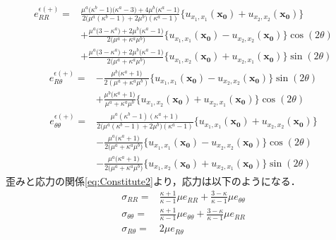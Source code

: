 \begin{align}
	e_{RR}^{\epsilon(+)}
	=&\frac{ \mu^{a}\bigl(\kappa^{b}-1\bigr)\bigl(\kappa^{a}-3\bigr)+4\mu^{b}\bigl(\kappa^{a}-1\bigr)　}
		{2\bigl(\mu^{a}(\kappa^{b}-1)+2\mu^{b}\bigr)(\kappa^{a}-1)}
	\bigl\{u_{x_{1},x_{1}}(\bm{x_{0}})+u_{x_{2},x_{2}}(\bm{x_{0}})\bigr\}
	\nonumber
	\\
	&+\frac{\mu^{a}\bigl(3-\kappa^{a}\bigr)+2\mu^{b}\bigl(\kappa^{a}-1\bigr)}{2\bigl(\mu^{a}+\kappa^{a}\mu^{b}\bigr)}
	\bigl\{u_{x_{1},x_{1}}(\bm{x_{0}})-u_{x_{2},x_{2}}(\bm{x_{0}})\bigr\}\cos(2\theta)
	\nonumber
	\\
	&+\frac{\mu^{a}\bigl(3-\kappa^{a}\bigr)+2\mu^{b}\bigl(\kappa^{a}-1\bigr)}{2\bigl(\mu^{a}+\kappa^{a}\mu^{b}\bigr)}
	\bigl\{u_{x_{1},x_{2}}(\bm{x_{0}})+u_{x_{2},x_{1}}(\bm{x_{0}})\bigr\}\sin(2\theta)
	\label{eq:eRROutEpsSol}
\end{align}
\begin{align}
	e_{R\theta}^{\epsilon(+)}
	=&-\frac{\mu^{b}\bigl(\kappa^{a}+1\bigr)}{2(\mu^{a}+\kappa^{a}\mu^{b})}
	\bigl\{u_{x_{1},x_{1}}(\bm{x_{0}})-u_{x_{2},x_{2}}(\bm{x_{0}})\bigr\}\sin(2\theta)
	\nonumber
	\\
	&+\frac{\mu^{b}\bigl(\kappa^{a}+1\bigr)}{\mu^{a}+\kappa^{a}\mu^{b}}
	\bigl\{u_{x_{1},x_{2}}(\bm{x_{0}})+u_{x_{2},x_{1}}(\bm{x_{0}})\bigr\}\cos(2\theta)
	\label{eq:eRThOutEpsSol}
\end{align}
\begin{align}
	e_{\theta\theta}^{\epsilon(+)}
	=&\frac{\mu^{a}(\kappa^{b}-1)(\kappa^{a}+1)}
	{2\bigl(\mu^{a}(\kappa^{b}-1)+2\mu^{b}\bigr)(\kappa^{a}-1)}
	\bigl\{u_{x_{1},x_{1}}(\bm{x_{0}})+u_{x_{2},x_{2}}(\bm{x_{0}})\bigr\}
	\nonumber
	\\
	&-\frac{\mu^{a}\bigl(\kappa^{a}+1\bigr)}{2\bigl(\mu^{a}+\kappa^{a}\mu^{b}\bigr)}
	\bigl\{u_{x_{1},x_{1}}(\bm{x_{0}})-u_{x_{2},x_{2}}(\bm{x_{0}})\bigr\}\cos(2\theta)
	\nonumber
	\\
	&-\frac{\mu^{a}\bigl(\kappa^{a}+1\bigr)}{2\bigl(\mu^{a}+\kappa^{a}\mu^{b}\bigr)}
	\bigl\{u_{x_{1},x_{2}}(\bm{x_{0}})+u_{x_{2},x_{1}}(\bm{x_{0}})\bigr\}\sin(2\theta)
	\label{eq:eThThOutEpsSol}
\end{align}
歪みと応力の関係\eqref{eq:Constitute2}より，応力は以下のようになる．
\begin{align}
	\sigma_{RR}
	=&\frac{\kappa+1}{\kappa-1}\mu e_{RR}^{}+\frac{3-\kappa}{\kappa-1}\mu e_{\theta\theta}^{}
	\nonumber
	\\
	\sigma_{\theta\theta}
	=&\frac{\kappa+1}{\kappa-1}\mu e_{\theta\theta}^{}+\frac{3-\kappa}{\kappa-1}\mu e_{RR}^{}
	\nonumber
	\\
	\sigma_{R\theta}=&2\mu e_{R\theta}^{}
	\label{eq:Constitute2}
\end{align}

